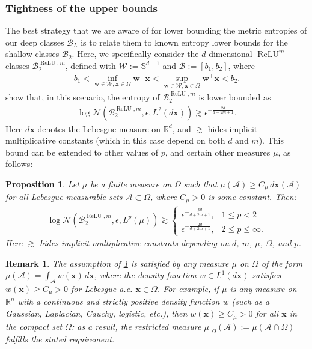 \documentclass{article}
\DeclareMathOperator{\ReLU}{\mathrm{ReLU}}
\def\vw{{\bm{w}}}
\def\vx{{\bm{x}}}
\def\cA{{\mathcal{A}}}
\def\cB{{\mathcal{B}}}
\def\cN{{\mathcal{N}}}
\def\cW{{\mathcal{W}}}
\def\bS{{\mathbb{S}}}
\newcommand{\R}{\mathbb{R}}
\newtheorem{proposition}[theorem]{Proposition}
\newtheorem{remark}[theorem]{Remark}
\begin{document}
\subsubsection{Tightness of the upper bounds} \label{sec:tightness_upper_bounds}
The best strategy that we are aware of for lower bounding the metric entropies of our deep classes $\cB_L$ is to relate them to known entropy lower bounds for the shallow classes $\cB_2$. Here, we specifically consider the $d$-dimensional $\ReLU^m$ classes $\cB_2^{\ReLU,m}$, defined with $\cW := \bS^{d-1}$ and $\cB := [b_1, b_2]$, where
\begin{align} \label{eq:bias_set_assumption}
    b_1 < \inf_{\vw \in \cW, \vx \in \Omega} \vw^\top \vx < \sup_{\vw \in \cW, \vx \in \Omega} \vw^\top \vx < b_2.
\end{align}
\cite{siegel2024sharp} show that, in this scenario, the entropy of $\cB_2^{\ReLU,m}$ is lower bounded as
\begin{align} \label{eq:siegel_xu_L2_Lebesgue_entropy_LB}
    \log \cN(\cB_2^{\ReLU,m}, \epsilon, L^2(d \vx)) \gtrsim \epsilon^{-\frac{2d}{d+2m+1}}.
\end{align}
Here $d \vx$ denotes the Lebesgue measure on $\R^d$, and $\gtrsim$ hides implicit multiplicative constants (which in this case depend on both $d$ and $m$). This bound can be extended to other values of $p$, and certain other measures $\mu$, as follows:
\begin{proposition} \label{prop:B2_entropy_lower_bounds}
    Let $\mu$ be a finite measure on $\Omega$ such that $\mu(\cA) \geq C_\mu \,d \vx( \cA)$ for all Lebesgue measurable sets $\cA \subset \Omega$, where $C_\mu > 0$ is some constant. Then:
    \begin{align}
        \log \cN(\cB_2^{\ReLU,m}, \epsilon, L^p(\mu)) \gtrsim \begin{cases}
            \epsilon^{-\frac{pd}{d+2m+1}}, &1 \leq p < 2 \\
            \epsilon^{-\frac{2d}{d+2m+1}}, &2 \leq p \leq \infty.
        \end{cases}
    \end{align}
    Here $\gtrsim$ hides implicit multiplicative constants depending on $d$, $m$, $\mu$, $\Omega$, and $p$.
    \end{proposition} 
    \begin{remark}
        The assumption of \cref{prop:B2_entropy_lower_bounds} is satisfied by any measure $\mu$ on $\Omega$ of the form $\mu(\cA) = \int_{\cA} w(\vx) \, d \vx$, where the density function $w \in L^1(d \vx)$ satisfies $w(\vx) \geq C_\mu > 0$ for Lebesgue-a.e. $\vx \in \Omega$. For example, if $\mu$ is any measure on $\R^n$ with a continuous and strictly positive density function $w$ (such as a Gaussian, Laplacian, Cauchy, logistic, etc.), then $w(\vx) \geq C_\mu > 0$ for all $\vx$ in the compact set $\Omega$: as a result, the restricted measure $\mu \rvert_\Omega( \cA) := \mu(\cA \cap \Omega)$ fulfills the stated requirement.
    \end{remark}
\end{document}
